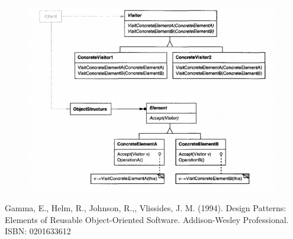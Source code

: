 \documentclass{article}
\begin{document}
\begin{figure}[h]
    \centering
    \includegraphics[width=11cm]{diagrams/pattern-23-visitor.png}
\end{figure}

\begin{thebibliography}{}
\bibitem{}
Gamma, E., Helm, R., Johnson, R.,, Vlissides, J. M. (1994). Design Patterns: Elements of Reusable Object-Oriented Software. Addison-Wesley Professional. ISBN: 0201633612
\end{thebibliography}
\end{document}
